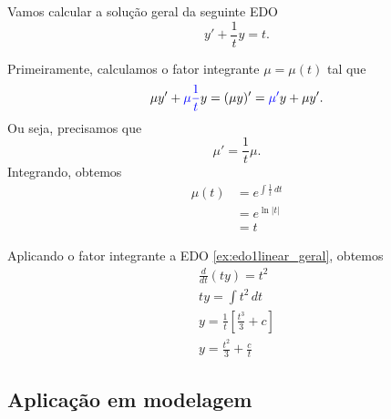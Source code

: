 \begin{ex}
  Vamos calcular a solução geral da seguinte EDO
  \begin{equation}\label{ex:edo1linear_geral}
    y' + \frac{1}{t}y = t.
  \end{equation}

  Primeiramente, calculamos o fator integrante $\mu = \mu(t)$ tal que
  \begin{equation}
    \mu y' + {\color{blue}\mu \frac{1}{t}} y = (\mu y)' = {\color{blue}\mu'}y + \mu y'.
  \end{equation}
  Ou seja, precisamos que
  \begin{equation}
    \mu' = \frac{1}{t}\mu.
  \end{equation}
  Integrando, obtemos
  \begin{align}
    \mu(t) &= e^{\int \frac{1}{t}\,dt} \\
           &= e^{\ln|t|} \\
           &= t
  \end{align}

  Aplicando o fator integrante a EDO \eqref{ex:edo1linear_geral}, obtemos
  \begin{gather}
    \frac{d}{dt}\left(t y\right) = t^2 \\
    ty = \int t^2\,dt \\
    y = \frac{1}{t}\left[\frac{t^3}{3} + c\right] \\
    y = \frac{t^2}{3} + \frac{c}{t}
  \end{gather}
\end{ex}

\subsection{Aplicação em modelagem}


